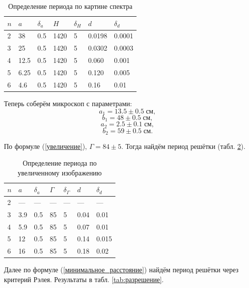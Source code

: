 \documentclass[a4paper]{article}
\begin{document}
\begin{table}[h]
	\centering
	\begin{tabular}{|l|l|l|l|l|l|l|}
		\hline
		$n$ & $a$  & $\delta_a$ & $H$  & $\delta_H$ & $d$     & $\delta_d$ \\ \hline
		2   & 38   & 0.5        & 1420 & 5          & 0.0198 & 0.0001    \\ \hline
		3   & 25   & 0.5        & 1420 & 5          & 0.0302 & 0.0003    \\ \hline
		4   & 12.5 & 0.5        & 1420 & 5          & 0.060 & 0.001    \\ \hline
		5   & 6.25 & 0.5        & 1420 & 5          & 0.120 & 0.005      \\ \hline
		6   & 4.6  & 0.5        & 1420 & 5          & 0.16 & 0.01    \\ \hline
	\end{tabular}
	\caption{Определение периода по картине спектра}
	\label{tab:спектр}
\end{table}
\newpage
Теперь соберём микроскоп с параметрами:
\[a_1 = 13.5\pm 0.5\; см,\]
\[b_1 = 48\pm 0.5\; см,\]
\[a_2 = 2.5\pm 0.1\; см,\]
\[b_2 = 59\pm 0.5\; см.\]

По формуле (\ref{увеличение}), $ \Gamma = 84\pm 5 $. Тогда найдём период решётки (табл. \ref{tab:изображение}).

\begin{table}[h]
	\centering
	\begin{tabular}{|l|l|l|l|l|l|l|}
		\hline
		$n$ & $a$ & $\delta_a$ & $\Gamma$ & $\delta_\Gamma$ & $d$  & $\delta_d$ \\ \hline
		2   & --- & ---        & ---      & ---             & ---  & ---        \\ \hline
		3   & 3.9 & 0.5        & 85       & 5               & 0.04 & 0.01       \\ \hline
		4   & 5.9 & 0.5        & 85       & 5               & 0.07 & 0.01       \\ \hline
		5   & 12  & 0.5        & 85       & 5               & 0.14 & 0.015      \\ \hline
		6   & 16  & 0.5        & 85       & 5               & 0.18 & 0.02       \\ \hline
	\end{tabular}
	\caption{Определение периода по увеличенному изображению}
	\label{tab:изображение}
\end{table}

Далее по формуле (\ref{минимальное_расстояние}) найдём период решётки через критерий Рэлея. Результаты в табл. \ref{tab:разрешение}.
\end{document}
